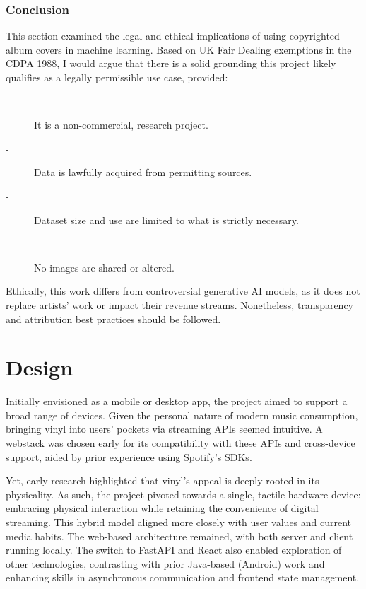               \subsubsection{Conclusion}
    
                  This section examined the legal and ethical implications of using copyrighted album covers in machine learning. Based on UK Fair Dealing exemptions in the CDPA 1988, I would argue that there is a solid grounding this project likely qualifies as a legally permissible use case, provided:
                  \begin{description}
                      \item[-] It is a non-commercial, research project.
                      \item[-] Data is lawfully acquired from permitting sources.
                      \item[-] Dataset size and use are limited to what is strictly necessary.
                      \item[-] No images are shared or altered. %
                  \end{description}
                  
                  Ethically, this work differs from controversial generative AI models, as it does not replace artists’ work or impact their revenue streams. Nonetheless, transparency and attribution best practices should be followed.
    
    \section{Design} %
    
        Initially envisioned as a mobile or desktop app, the project aimed to support a broad range of devices. Given the personal nature of modern music consumption, bringing vinyl into users' pockets via streaming APIs seemed intuitive. A webstack was chosen early for its compatibility with these APIs and cross-device support, aided by prior experience using Spotify’s SDKs.
    
        Yet, early research highlighted that vinyl’s appeal is deeply rooted in its physicality. As such, the project pivoted towards a single, tactile hardware device: embracing physical interaction while retaining the convenience of digital streaming. This hybrid model aligned more closely with user values and current media habits. The web-based architecture remained, with both server and client running locally. The switch to FastAPI and React also enabled exploration of other technologies, contrasting with prior Java-based (Android) work and enhancing skills in asynchronous communication and frontend state management.
    
